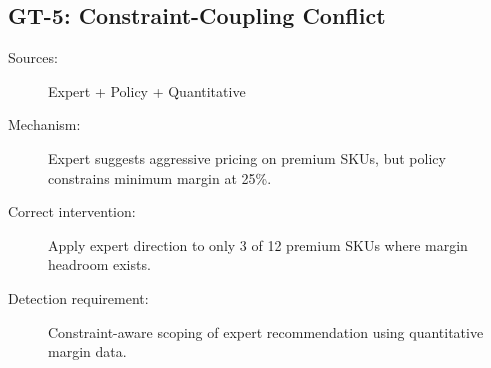 \documentclass[11pt,a4paper]{article}
\begin{document}
\subsection{GT-5: Constraint-Coupling Conflict}

\begin{description}
    \item[Sources:] Expert + Policy + Quantitative
    \item[Mechanism:] Expert suggests aggressive pricing on premium SKUs, but policy constrains minimum margin at 25\%.
    \item[Correct intervention:] Apply expert direction to only 3 of 12 premium SKUs where margin headroom exists.
    \item[Detection requirement:] Constraint-aware scoping of expert recommendation using quantitative margin data.
\end{description}
\end{document}
